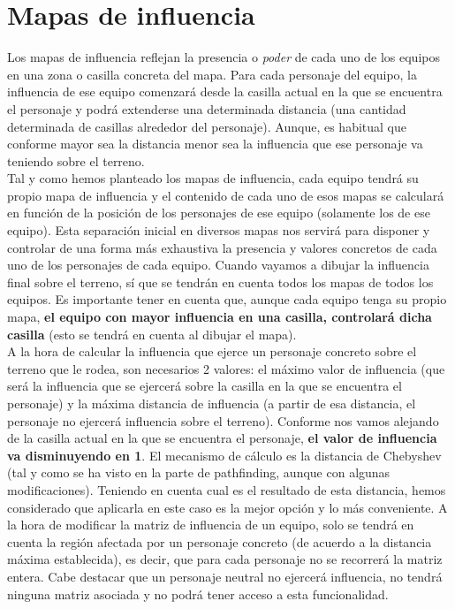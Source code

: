 \medskip
\section{Mapas de influencia}
\label{mapas-influencia}
Los mapas de influencia reflejan la presencia o \textit{poder} de cada uno de los equipos en una zona o casilla concreta del mapa. Para cada personaje del equipo, la influencia de ese equipo comenzará desde la casilla actual en la que se encuentra el personaje y podrá extenderse una determinada distancia (una cantidad determinada de casillas alrededor del personaje). Aunque, es habitual que conforme mayor sea la distancia menor sea la influencia que ese personaje va teniendo sobre el terreno. \\

Tal y como hemos planteado los mapas de influencia, cada equipo tendrá su propio mapa de influencia y el contenido de cada uno de esos mapas se calculará en función de la posición de los personajes de ese equipo (solamente los de ese equipo). Esta separación inicial en diversos mapas nos servirá para disponer y controlar de una forma más exhaustiva la presencia y valores concretos de cada uno de los personajes de cada equipo. Cuando vayamos a dibujar la influencia final sobre el terreno, sí que se tendrán en cuenta todos los mapas de todos los equipos. Es importante tener en cuenta que, aunque cada equipo tenga su propio mapa, \textbf{el equipo con mayor influencia en una casilla, controlará dicha casilla} (esto se tendrá en cuenta al dibujar el mapa). \\

A la hora de calcular la influencia que ejerce un personaje concreto sobre el terreno que le rodea, son necesarios 2 valores: el máximo valor de influencia (que será la influencia que se ejercerá sobre la casilla en la que se encuentra el personaje) y la máxima distancia de influencia (a partir de esa distancia, el personaje no ejercerá influencia sobre el terreno). Conforme nos vamos alejando de la casilla actual en la que se encuentra el personaje, \textbf{el valor de influencia va disminuyendo en 1}. El mecanismo de cálculo es la distancia de Chebyshev (tal y como se ha visto en la parte de pathfinding, aunque con algunas modificaciones). Teniendo en cuenta cual es el resultado de esta distancia, hemos considerado que aplicarla en este caso es la mejor opción y lo más conveniente. A la hora de modificar la matriz de influencia de un equipo, solo se tendrá en cuenta la región afectada por un personaje concreto (de acuerdo a la distancia máxima establecida), es decir, que para cada personaje no se recorrerá la matriz entera. Cabe destacar que un personaje neutral no ejercerá influencia, no tendrá ninguna matriz asociada y no podrá tener acceso a esta funcionalidad. \\

